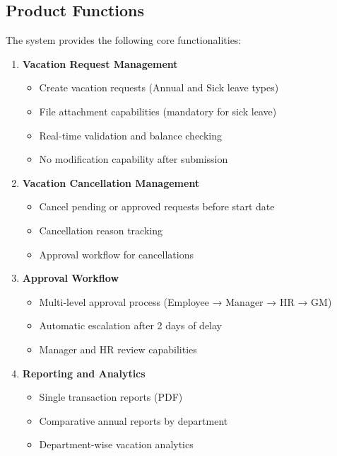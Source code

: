 \documentclass[12pt,a4paper]{article}
\begin{document}
\subsection{Product Functions}
The system provides the following core functionalities:

\begin{enumerate}
    \item \textbf{Vacation Request Management}
    \begin{itemize}
        \item Create vacation requests (Annual and Sick leave types)
        \item File attachment capabilities (mandatory for sick leave)
        \item Real-time validation and balance checking
        \item No modification capability after submission
    \end{itemize}
    
    \item \textbf{Vacation Cancellation Management}
    \begin{itemize}
        \item Cancel pending or approved requests before start date
        \item Cancellation reason tracking
        \item Approval workflow for cancellations
    \end{itemize}
    
    \item \textbf{Approval Workflow}
    \begin{itemize}
        \item Multi-level approval process (Employee → Manager → HR → GM)
        \item Automatic escalation after 2 days of delay
        \item Manager and HR review capabilities
    \end{itemize}
    
    \item \textbf{Reporting and Analytics}
    \begin{itemize}
        \item Single transaction reports (PDF)
        \item Comparative annual reports by department
        \item Department-wise vacation analytics
    \end{itemize}
    

\end{enumerate}
\end{document}
